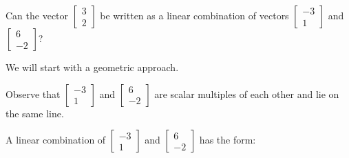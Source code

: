 \documentclass{ximera}
\begin{document}
\begin{example}
Can the vector $\begin{bmatrix}3\\2\end{bmatrix}$ be written as a linear combination of vectors $\begin{bmatrix}-3\\1\end{bmatrix}$ and $\begin{bmatrix}6\\-2\end{bmatrix}$?
\begin{explanation}
We will start with a geometric approach.
\begin{image}
\end{image}

Observe that $\begin{bmatrix}-3\\1\end{bmatrix}$ and $\begin{bmatrix}6\\-2\end{bmatrix}$ are scalar multiples of each other and lie on the same line.  

A linear combination of $\begin{bmatrix}-3\\1\end{bmatrix}$ and $\begin{bmatrix}6\\-2\end{bmatrix}$ has the form:


\end{explanation}
\end{example}
\end{document}
